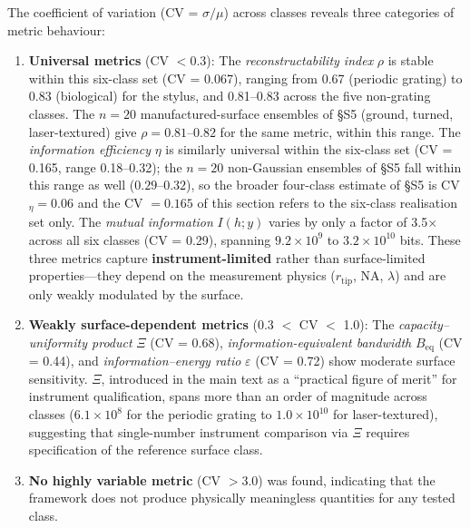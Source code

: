 \documentclass[review,12pt]{elsarticle}
\begin{document}
The coefficient of variation (CV = $\sigma/\mu$) across classes reveals three categories of metric behaviour:

\begin{enumerate}
    \item \textbf{Universal metrics} (CV $< 0.3$): The \emph{reconstructability index} $\rho$ is stable within this six-class set (CV = 0.067), ranging from 0.67 (periodic grating) to 0.83 (biological) for the stylus, and 0.81--0.83 across the five non-grating classes. The $n=20$ manufactured-surface ensembles of \S S5 (ground, turned, laser-textured) give $\rho = 0.81$--$0.82$ for the same metric, within this range. The \emph{information efficiency} $\eta$ is similarly universal within the six-class set (CV = 0.165, range 0.18--0.32); the $n=20$ non-Gaussian ensembles of \S S5 fall within this range as well ($0.29$--$0.32$), so the broader four-class estimate of \S S5 is CV$_\eta=0.06$ and the CV $=0.165$ of this section refers to the six-class realisation set only. The \emph{mutual information} $I(h;y)$ varies by only a factor of 3.5$\times$ across all six classes (CV = 0.29), spanning $9.2\times10^9$ to $3.2\times10^{10}$ bits. These three metrics capture \textbf{instrument-limited} rather than surface-limited properties---they depend on the measurement physics ($r_\mathrm{tip}$, NA, $\lambda$) and are only weakly modulated by the surface.
    
    \item \textbf{Weakly surface-dependent metrics} (0.3 $<$ CV $<$ 1.0): The \emph{capacity--uniformity product} $\Xi$ (CV = 0.68), \emph{information-equivalent bandwidth} $B_\mathrm{eq}$ (CV = 0.44), and \emph{information--energy ratio} $\varepsilon$ (CV = 0.72) show moderate surface sensitivity. $\Xi$, introduced in the main text as a ``practical figure of merit'' for instrument qualification, spans more than an order of magnitude across classes ($6.1\times10^8$ for the periodic grating to $1.0\times10^{10}$ for laser-textured), suggesting that single-number instrument comparison via $\Xi$ requires specification of the reference surface class.
    
    \item \textbf{No highly variable metric} (CV $> 3.0$) was found, indicating that the framework does not produce physically meaningless quantities for any tested class.
\end{enumerate}
\end{document}

